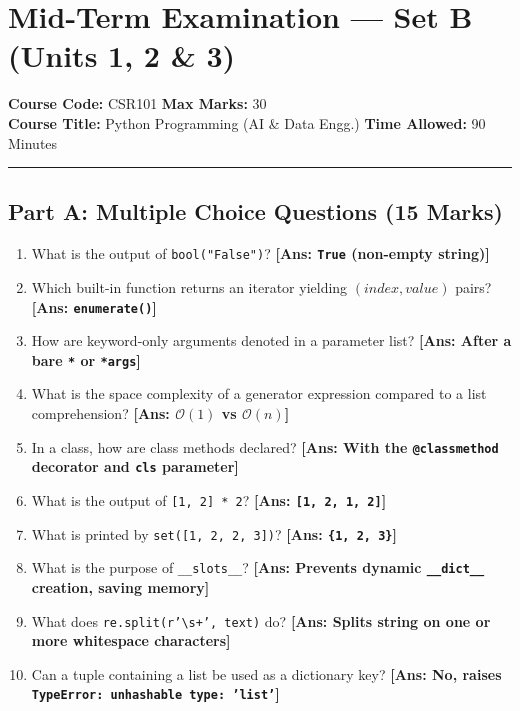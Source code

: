 \section{Mid-Term Examination --- Set B (Units 1, 2 \& 3)}
\noindent\textbf{Course Code:} CSR101 \hfill \textbf{Max Marks:} 30\\
\textbf{Course Title:} Python Programming (AI \& Data Engg.) \hfill \textbf{Time Allowed:} 90 Minutes\\
\vspace{4mm}
\hrule
\vspace{4mm}

\subsection*{Part A: Multiple Choice Questions (15 Marks)}
\begin{enumerate}[label=\textbf{\arabic*.}]
    \item What is the output of \texttt{bool("False")}? \hfill \textbf{[Ans: \texttt{True} (non-empty string)]}
    \item Which built-in function returns an iterator yielding $(index, value)$ pairs? \hfill \textbf{[Ans: \texttt{enumerate()}]}
    \item How are keyword-only arguments denoted in a parameter list? \hfill \textbf{[Ans: After a bare \texttt{*} or \texttt{*args}]}
    \item What is the space complexity of a generator expression compared to a list comprehension? \hfill \textbf{[Ans: $\mathcal{O}(1)$ vs $\mathcal{O}(n)$]}
    \item In a class, how are class methods declared? \hfill \textbf{[Ans: With the \texttt{@classmethod} decorator and \texttt{cls} parameter]}
    \item What is the output of \texttt{[1, 2] * 2}? \hfill \textbf{[Ans: \texttt{[1, 2, 1, 2]}]}
    \item What is printed by \texttt{set([1, 2, 2, 3])}? \hfill \textbf{[Ans: \texttt{\{1, 2, 3\}}]}
    \item What is the purpose of \texttt{\_\_slots\_\_}? \hfill \textbf{[Ans: Prevents dynamic \texttt{\_\_dict\_\_} creation, saving memory]}
    \item What does \texttt{re.split(r'\textbackslash s+', text)} do? \hfill \textbf{[Ans: Splits string on one or more whitespace characters]}
    \item Can a tuple containing a list be used as a dictionary key? \hfill \textbf{[Ans: No, raises \texttt{TypeError: unhashable type: 'list'}]}

\end{enumerate}
